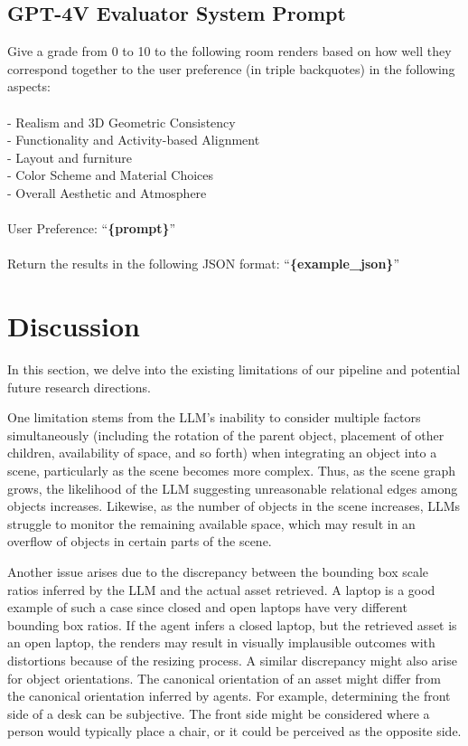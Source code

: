 \subsection{GPT-4V Evaluator System Prompt}

Give a grade from 0 to 10 to the following room renders based on how well they correspond together to the user preference (in triple backquotes) in the following aspects:
\\\\
- Realism and 3D Geometric Consistency
\\
- Functionality and Activity-based Alignment
\\
- Layout and furniture  
\\
- Color Scheme and Material Choices
\\
- Overall Aesthetic and Atmosphere   
\\\\
User Preference:
``\textbf{\{prompt\}}''
\\\\
Return the results in the following JSON format:
``\textbf{\{example\_json\}}''

\section{Discussion}

In this section, we delve into the existing limitations of our pipeline and potential future research directions.

One limitation stems from the LLM's inability to consider multiple factors simultaneously (including the rotation of the parent object, placement of other children, availability of space, and so forth) when integrating an object into a scene, particularly as the scene becomes more complex.
Thus, as the scene graph grows, the likelihood of the LLM suggesting unreasonable relational edges among objects increases. Likewise, as the number of objects in the scene increases, LLMs struggle to monitor the remaining available space, which may result in an overflow of objects in certain parts of the scene.


Another issue arises due to the discrepancy between the bounding box scale ratios inferred by the LLM and the actual asset retrieved. A laptop is a good example of such a case since closed and open laptops have very different bounding box ratios. If the agent infers a closed laptop, but the retrieved asset is an open laptop, the renders may result in visually implausible outcomes with distortions because of the resizing process. A similar discrepancy might also arise for object orientations. The canonical orientation of an asset might differ from the canonical orientation inferred by agents. For example, determining the front side of a desk can be subjective. The front side might be considered where a person would typically place a chair, or it could be perceived as the opposite side.

